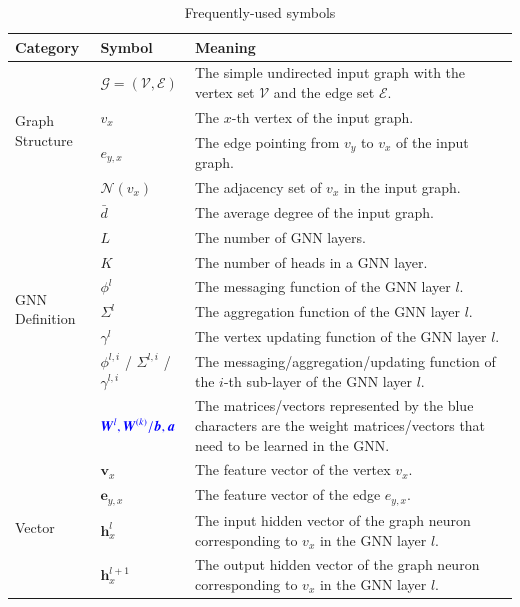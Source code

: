 \begin{table}[h]
    \caption{Frequently-used symbols}
    \label{tab:notations}
    \centering
    \small
    \begin{tabular}{p{3em}lp{35em}}
        \toprule
       Category & Symbol & Meaning \\
        \midrule
        \multirow[c]{4}{3em}{Graph Structure}& $\mathcal{G}=(\mathcal{V}, \mathcal{E})$ & The simple undirected input graph with the vertex set $\mathcal{V}$ and the edge set $\mathcal{E}$. \\
        & $v_x$ & The $x$-th vertex of the input graph. \\
        & $e_{y,x}$ & The edge pointing from $v_y$ to $v_x$ of the input graph. \\
        & $\mathcal{N}(v_x)$ & The adjacency set of $v_x$ in the input graph. \\ 
        & $\bar{d}$ & The average degree of the input graph. \\ \midrule
        \multirow[c]{6}{3em}{GNN Definition}& $L$ & The number of GNN layers. \\
        & $K$ & The number of heads in a GNN layer. \\
        & $\phi^l$ & The messaging function of the GNN layer $l$. \\
        & $\Sigma^l$ & The aggregation function of the GNN layer $l$. \\
        & $\gamma^l$ & The vertex updating function of the GNN layer $l$. \\ 
        & $\phi^{l,i}$ / $\Sigma^{l,i}$ / $\gamma^{l,i}$ & The messaging/aggregation/updating function of the $i$-th sub-layer of the GNN layer  $l$.\\
        & $\textcolor{blue}{\boldsymbol{W}^l, \boldsymbol{W}^{(k)}/\boldsymbol{b}, \boldsymbol{a}}$ & The matrices/vectors represented by the blue characters are the weight matrices/vectors that need to be learned in the GNN. \\  \midrule
        \multirow[c]{8}{3em}{Vector}& $\boldsymbol{v}_x$ & The feature vector of the vertex $v_x$. \\
        & $\boldsymbol{e}_{y,x}$ & The feature vector of the edge $e_{y,x}$.  \\
        & $\boldsymbol{h}_x^{l}$ &  The {input} hidden vector of the graph neuron corresponding to $v_x$ in the GNN layer $l$. \\
        & $\boldsymbol{h}_x^{l+1}$ &  The {output} hidden vector of the graph neuron corresponding to $v_x$ in the GNN layer $l$.\\

\end{tabular}
\end{table}

